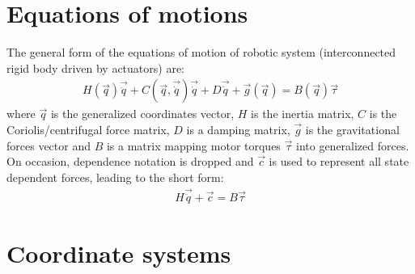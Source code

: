 \section{Equations of motions}
\label{sec:eom}

The general form of the equations of motion of robotic system (interconnected rigid body driven by actuators) are:
%
\begin{align}
H(\vec{q}) \vec{\ddot{q}} + C(\vec{q},\vec{\dot{q}}) \vec{\dot{q}} + D \vec{\dot{q}} + \vec{g}(\vec{q}) = B(\vec{q}) \vec{\tau} 
\label{eq:manipulator}
\end{align}
%
where $\vec{q}$ is the generalized coordinates vector, $H$ is the inertia matrix, $C$ is the Coriolis/centrifugal force matrix, $D$ is a damping matrix, $\vec{g}$ is the gravitational forces vector and $B$ is a matrix mapping motor torques $\vec{\tau}$ into generalized forces.
On occasion, dependence notation is dropped and $\vec{c}$ is used to represent all state dependent forces, leading to the short form:
%
\begin{align}
H \vec{\ddot{q}} + \vec{c} = B \vec{\tau} 
\label{eq:manipulator_short}
\end{align}

\section{Coordinate systems}
\label{sec:coord}

